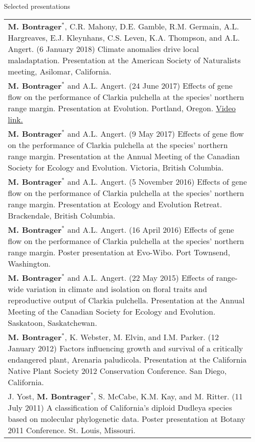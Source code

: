 \documentclass[letterpaper,11pt,oneside]{article}
\begin{document}

\noindent\Large{Selected presentations}  
\normalsize
\bigskip

\bgroup
\def\arraystretch{1.2}
\noindent \begin{tabular}{@{} >{\raggedright\arraybackslash}p{16.51cm}}
\textbf{M. Bontrager}$^{*}$, C.R. Mahony, D.E. Gamble, R.M. Germain, A.L. Hargreaves, E.J. Kleynhans, C.S. Leven, K.A. Thompson, and A.L. Angert. (6 January 2018) Climate anomalies drive local maladaptation. Presentation at the American Society of Naturalists meeting, Asilomar, California. \\
\textbf{M. Bontrager}$^{*}$ and A.L. Angert. (24 June 2017) Effects of gene flow on the performance of Clarkia pulchella at the species’ northern range margin. Presentation at Evolution. Portland, Oregon. \href{https://www.youtube.com/watch?v=HqVgQzIJLyA}{Video link.} \\
\textbf{M. Bontrager}$^{*}$ and A.L. Angert. (9 May 2017) Effects of gene flow on the performance of Clarkia pulchella at the species’ northern range margin. Presentation at the Annual Meeting of the Canadian Society for Ecology and Evolution. Victoria, British Columbia. \\
\textbf{M. Bontrager}$^{*}$ and A.L. Angert. (5 November 2016) Effects of gene flow on the performance of Clarkia pulchella at the species’ northern range margin. Presentation at Ecology and Evolution Retreat. Brackendale, British Columbia. \\
\textbf{M. Bontrager}$^{*}$ and A.L. Angert. (16 April 2016) Effects of gene flow on the performance of Clarkia pulchella at the species’ northern range margin. Poster presentation at Evo-Wibo. Port Townsend, Washington. \\
\textbf{M. Bontrager}$^{*}$ and A.L. Angert. (22 May 2015) Effects of range-wide variation in climate and isolation on floral traits and reproductive output of Clarkia pulchella. Presentation at the Annual Meeting of the Canadian Society for Ecology and Evolution. Saskatoon, Saskatchewan. \\
\textbf{M. Bontrager}$^{*}$, K. Webster, M. Elvin, and I.M. Parker. (12 January 2012) Factors influencing growth and survival of a critically endangered plant, Arenaria paludicola. Presentation at the California Native Plant Society 2012 Conservation Conference. San Diego, California. \\
J. Yost, \textbf{M. Bontrager}$^{*}$, S. McCabe, K.M. Kay, and M. Ritter. (11 July 2011) A classification of California’s diploid Dudleya species based on molecular phylogenetic data. Poster presentation at Botany 2011 Conference. St. Louis, Missouri. \\
\end{tabular}
\egroup
\end{document}
